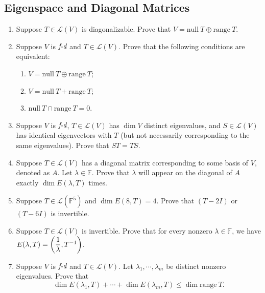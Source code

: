\documentclass[11pt, letterpaper]{article}
\def\F{\mathbb{F}}
\def\L{\mathcal{L}}
\def\T{T^{-1}}
\def\FD{\emph{f-d}}
\def\Null{\mathrm{null\ }}
\def\range{\mathrm{range\ }}
\begin{document}
\subsection{Eigenspace and Diagonal Matrices}
\begin{enumerate}
	\item Suppose $T\in\L(V)$ is diagonalizable. Prove that $V=\Null T\oplus\range T$.
	\item Suppose $V$ is $\FD$ and $T\in\L(V)$. Prove that the following conditions are equivalent: \begin{enumerate}\item $V=\Null T\oplus\range T$; \item $V=\Null T+\range T$; \item $\Null T\cap\range T=\qty{0}$. \end{enumerate}
	\item Suppose $V$ is $\FD$, $T\in\L(V)$ has $\dim V$ distinct eigenvalues, and $S\in\L(V)$ has identical eigenvectors with $T$ (but not necessarily corresponding to the same eigenvalues). Prove that $ST=TS$.
	\item Suppose $T\in\L(V)$ has a diagonal matrix corresponding to some basis of $V$, denoted as $A$. Let $\lambda\in\F$. Prove that $\lambda$ will appear on the diagonal of $A$ exactly $\dim E(\lambda,T)$ times. 
	\item Suppose $T\in\L(\F^5)$ and $\dim E(8,T)=4$. Prove that $(T-2I)$ or $(T-6I)$ is invertible.
	\item Suppose $T\in\L(V)$ is invertible. Prove that for every nonzero $\lambda\in\F$, we have $E(\lambda,T)=\qty(\dfrac{1}{\lambda},\T)$.
	\item Suppose $V$ is $\FD$ and $T\in\L(V)$. Let $\lambda_1,\cdots,\lambda_m$ be distinct nonzero eigenvalues. Prove that \[\dim E(\lambda_1,T)+\cdots+\dim E(\lambda_m,T)\leq\dim\range T.\]
\end{enumerate}
\end{document}
